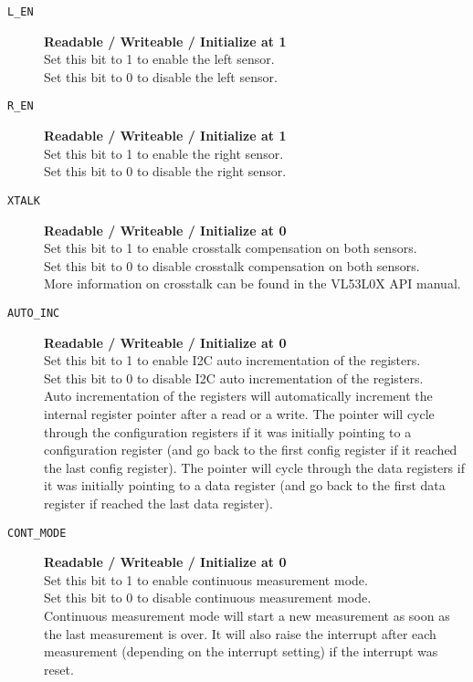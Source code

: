 \begin{description}
	\item[\texttt{L\_EN}] \qquad \textbf{Readable / Writeable / Initialize at 1}\\
	Set this bit to 1 to enable the left sensor.\\
	Set this bit to 0 to disable the left sensor.
	
	\item[\texttt{R\_EN}] \qquad \textbf{Readable / Writeable / Initialize at 1}\\
	Set this bit to 1 to enable the right sensor.\\
	Set this bit to 0 to disable the right sensor.
	
	\item[\texttt{XTALK}] \qquad \textbf{Readable / Writeable / Initialize at 0}\\
	Set this bit to 1 to enable crosstalk compensation on both sensors.\\
	Set this bit to 0 to disable crosstalk compensation on both sensors.\\
	More information on crosstalk can be found in the VL53L0X API manual.
	
	\item[\texttt{AUTO\_INC}] \qquad \textbf{Readable / Writeable / Initialize at 0}\\
	Set this bit to 1 to enable I2C auto incrementation of the registers.\\
	Set this bit to 0 to disable I2C auto incrementation of the registers.\\
	Auto incrementation of the registers will automatically increment the internal register pointer after a read or a write. The pointer will cycle through the configuration registers if it was initially pointing to a configuration register (and go back to the first config register if it reached the last config register). The pointer will cycle through the data registers if it was initially pointing to a data register (and go back to the first data register if reached the last data register).
	
	\item[\texttt{CONT\_MODE}] \qquad \textbf{Readable / Writeable / Initialize at 0}\\
	Set this bit to 1 to enable continuous measurement mode.\\
	Set this bit to 0 to disable continuous measurement mode.\\
	Continuous measurement mode will start a new measurement as soon as the last measurement is over. It will also raise the interrupt after each measurement (depending on the interrupt setting) if the interrupt was reset. 
	

\end{description}
